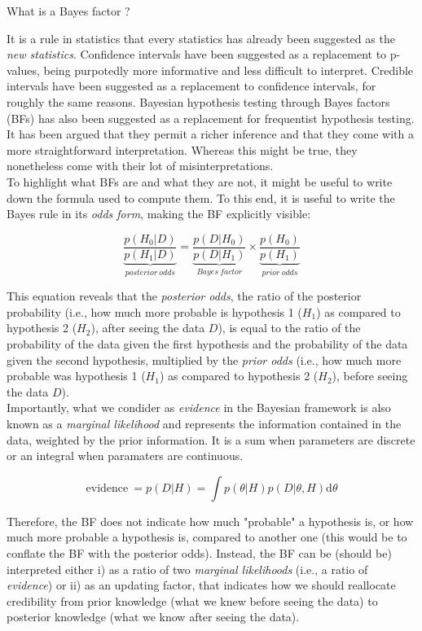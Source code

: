\documentclass[a4paper,12pt,twoside,openright,oldfontcommands]{memoir}
\begin{document}
\begin{mybox}[label = BF]{What is a Bayes factor ?}

It is a rule in statistics that every statistics has already been suggested as the \textit{new statistics}. Confidence intervals have been suggested as a replacement to p-values, being purpotedly more informative and less difficult to interpret. Credible intervals have been suggested as a replacement to confidence intervals, for roughly the same reasons. Bayesian hypothesis testing through Bayes factors (BFs) has also been suggested as a replacement for frequentist hypothesis testing. It has been argued that they permit a richer inference and that they come with a more straightforward interpretation. Whereas this might be true, they nonetheless come with their lot of misinterpretations.\\

To highlight what BFs are and what they are not, it might be useful to write down the formula used to compute them. To this end, it is useful to write the Bayes rule in its \textit{odds form}, making the BF explicitly visible:

$$\underbrace{\dfrac{p(H_{0}|D)}{p(H_{1}|D)}}_{posterior\ odds} = \underbrace{\dfrac{p(D|H_{0})}{p(D|H_{1})}}_{Bayes\ factor} \times \underbrace{\dfrac{p(H_{0})}{p(H_{1})}}_{prior\ odds}$$

This equation reveals that the \textit{posterior odds}, the ratio of the posterior probability (i.e., how much more probable is hypothesis 1 ($H_{1}$) as compared to hypothesis 2 ($H_{2}$), after seeing the data $D$), is equal to the ratio of the probability of the data given the first hypothesis and the probability of the data given the second hypothesis, multiplied by the \textit{prior odds} (i.e., how much more probable was hypothesis 1 ($H_{1}$) as compared to hypothesis 2 ($H_{2}$), before seeing the data $D$).\\ 

Importantly, what we condider as \textit{evidence} in the Bayesian framework is also known as a \textit{marginal likelihood} and represents the information contained in the data, weighted by the prior information. It is a sum when parameters are discrete or an integral when paramaters are continuous.

$$\text{evidence}\ = p(D|H) = \int p(\theta|H) p(D|\theta,H) \text{d}\theta$$

Therefore, the BF does not indicate how much "probable" a hypothesis is, or how much more probable a hypothesis is, compared to another one (this would be to conflate the BF with the posterior odds). Instead, the BF can be (should be) interpreted either i) as a ratio of two \textit{marginal likelihoods} (i.e., a ratio of \textit{evidence}) or ii) as an updating factor, that indicates how we should reallocate credibility from prior knowledge (what we knew before seeing the data) to posterior knowledge (what we know after seeing the data).

\end{mybox}
\end{document}
